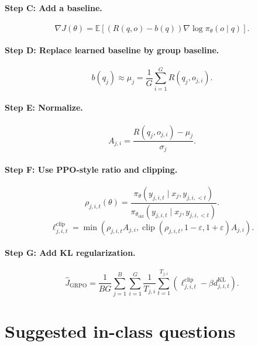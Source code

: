 \documentclass[11pt]{article}
\newcommand{\E}{\mathbb{E}}
\newcommand{\clip}{\operatorname{clip}}
\newcommand{\old}{\mathrm{old}}
\newcommand{\GRPO}{\mathrm{GRPO}}
\begin{document}
\paragraph{Step C: Add a baseline.}
\begin{equation}
\nabla J(\theta)=\E[(R(q,o)-b(q))\nabla\log\pi_\theta(o\mid q)].
\end{equation}

\paragraph{Step D: Replace learned baseline by group baseline.}
\begin{equation}
 b(q_j)\approx \mu_j=\frac{1}{G}\sum_{i=1}^{G}R(q_j,o_{j,i}).
\end{equation}

\paragraph{Step E: Normalize.}
\begin{equation}
A_{j,i}=\frac{R(q_j,o_{j,i})-\mu_j}{\sigma_j}.
\end{equation}

\paragraph{Step F: Use PPO-style ratio and clipping.}
\begin{equation}
\rho_{j,i,t}(\theta)=\frac{\pi_\theta(y_{j,i,t}\mid x_j,y_{j,i,<t})}
{\pi_{\theta_{\old}}(y_{j,i,t}\mid x_j,y_{j,i,<t})}.
\end{equation}
\begin{equation}
\ell_{j,i,t}^{\mathrm{clip}}
=\min\left(\rho_{j,i,t}A_{j,i},\clip(\rho_{j,i,t},1-\varepsilon,1+\varepsilon)A_{j,i}\right).
\end{equation}

\paragraph{Step G: Add KL regularization.}
\begin{equation}
\widehat{J}_{\GRPO}
=\frac{1}{BG}\sum_{j=1}^{B}\sum_{i=1}^{G}\frac{1}{T_{j,i}}\sum_{t=1}^{T_{j,i}}
\left(\ell_{j,i,t}^{\mathrm{clip}}-\beta d_{j,i,t}^{\mathrm{KL}}\right).
\end{equation}

\section{Suggested in-class questions}
\end{document}
